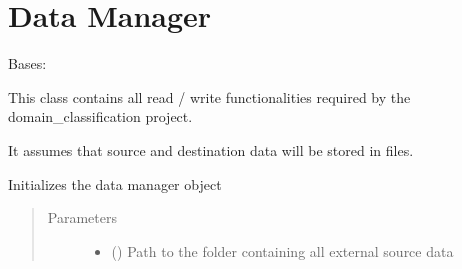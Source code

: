 \documentclass[letterpaper,10pt,english]{sphinxmanual}
\begin{document}
\chapter{Data Manager}
\label{\detokenize{dc_data_manager:data-manager}}\label{\detokenize{dc_data_manager::doc}}\label{\detokenize{dc_data_manager:module-src.data_manager}}

\begin{fulllineitems}
\label{\detokenize{dc_data_manager:src.data_manager.DataManager}}
\sphinxAtStartPar
Bases: 

\sphinxAtStartPar
This class contains all read / write functionalities required by the
domain\_classification project.

\sphinxAtStartPar
It assumes that source and destination data will be stored in files.

\begin{fulllineitems}
\label{\detokenize{dc_data_manager:src.data_manager.DataManager.__init__}}
\sphinxAtStartPar
Initializes the data manager object
\begin{quote}\begin{description}
\item[{Parameters}] \leavevmode\begin{itemize}
\item {} 
\sphinxAtStartPar
{} () \textendash{} Path to the folder containing all external source data


\end{itemize}
\end{description}
\end{quote}
\end{fulllineitems}
\end{fulllineitems}
\end{document}
